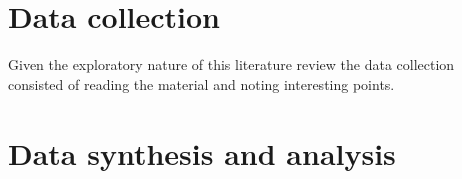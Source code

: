 \documentclass[a4paper]{book}
\begin{document}

	


\section{Data collection}
Given the exploratory nature of this literature review the data collection consisted of reading the material and
noting interesting points. 

\section{Data synthesis and analysis}
\end{document}
